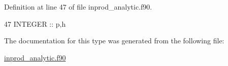 Definition at line 47 of file inprod\+\_\+analytic.\+f90.


\begin{DoxyCode}
47      \textcolor{keywordtype}{INTEGER} :: p,h
\end{DoxyCode}


The documentation for this type was generated from the following file\+:\begin{DoxyCompactItemize}
\item 
\hyperlink{inprod__analytic_8f90}{inprod\+\_\+analytic.\+f90}\end{DoxyCompactItemize}
